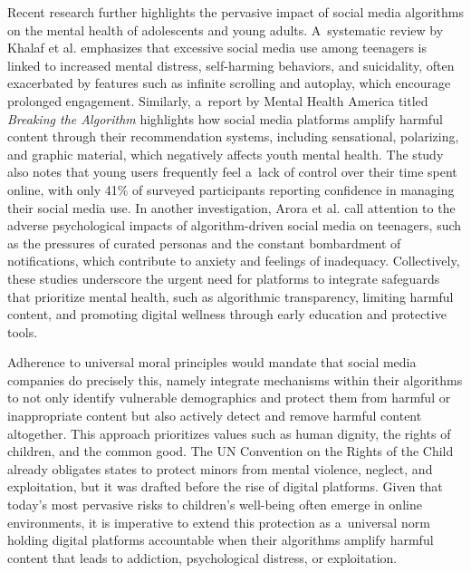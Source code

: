 \documentclass[%
  manuscript=article,
  year=2024,
  volume=77,
  doi=10.59203/zfn.77.707,
]{zfn}
\begin{document}
Recent research further highlights the pervasive impact of social media algorithms on the mental health of adolescents and young adults. A~systematic review by Khalaf et al. 
\parencite*[][]{khalaf_impact_2023} %
 emphasizes that excessive social media use among teenagers is linked to increased mental distress, self-harming behaviors, and suicidality, often exacerbated by features such as infinite scrolling and autoplay, which encourage prolonged engagement. Similarly, a~report by Mental Health America titled \textit{Breaking the Algorithm} 
\parencite*[][]{adebukola_breaking_2024} %
 highlights how social media platforms amplify harmful content through their recommendation systems, including sensational, polarizing, and graphic material, which negatively affects youth mental health. The study also notes that young users frequently feel a~lack of control over their time spent online, with only 41\% of surveyed participants reporting confidence in managing their social media use. In another investigation, Arora et al. 
\parencite*[][]{arora_pessimism_2024} %
 call attention to the adverse psychological impacts of algorithm-driven social media on teenagers, such as the pressures of curated personas and the constant bombardment of notifications, which contribute to anxiety and feelings of inadequacy. Collectively, these studies underscore the urgent need for platforms to integrate safeguards that prioritize mental health, such as algorithmic transparency, limiting harmful content, and promoting digital wellness through early education and protective tools.



Adherence to universal moral principles would mandate that social media companies do precisely this, namely integrate mechanisms within their algorithms to not only identify vulnerable demographics and protect them from harmful or inappropriate content but also actively detect and remove harmful content altogether. This approach prioritizes values such as human dignity, the rights of children, and the common good. The UN Convention on the Rights of the Child 
\parencite[][]{unicef_convention_1990} %
 already obligates states to protect minors from mental violence, neglect, and exploitation, but it was drafted before the rise of digital platforms. Given that today's most pervasive risks to children's well-being often emerge in online environments, it is imperative to extend this protection as a~universal norm holding digital platforms accountable when their algorithms amplify harmful content that leads to addiction, psychological distress, or exploitation.
\end{document}
